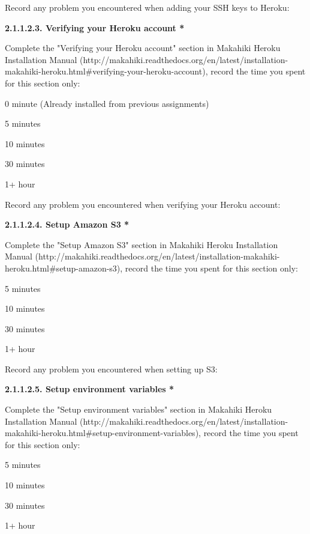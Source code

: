 Record any problem you encountered when adding your SSH keys to Heroku:

{\bf 2.1.1.2.3. Verifying your Heroku account *}

Complete the "Verifying your Heroku account" section in Makahiki Heroku Installation Manual (http://makahiki.readthedocs.org/en/latest/installation-makahiki-heroku.html\#verifying-your-heroku-account), record the time you spent for this section only:

\begin{compactitem}
\item 0 minute (Already installed from previous assignments)
\item 5 minutes
\item  10 minutes
\item  30 minutes
\item  1+ hour
\end{compactitem}

Record any problem you encountered when verifying your Heroku account:

{\bf 2.1.1.2.4. Setup Amazon S3 *}

Complete the "Setup Amazon S3" section in Makahiki Heroku Installation Manual (http://makahiki.readthedocs.org/en/latest/installation-makahiki-heroku.html\#setup-amazon-s3), record the time you spent for this section only:

\begin{compactitem}
\item 5 minutes
\item  10 minutes
\item  30 minutes
\item  1+ hour
\end{compactitem}

Record any problem you encountered when setting up S3:

{\bf 2.1.1.2.5. Setup environment variables *}

Complete the "Setup environment variables" section in Makahiki Heroku Installation Manual (http://makahiki.readthedocs.org/en/latest/installation-makahiki-heroku.html\#setup-environment-variables), record the time you spent for this section only:

\begin{compactitem}
\item 5 minutes
\item  10 minutes
\item  30 minutes
\item  1+ hour
\end{compactitem}

